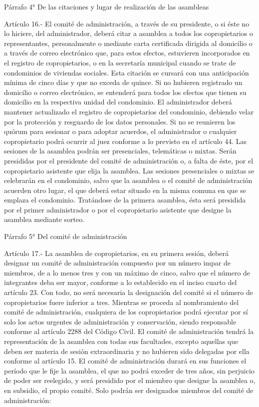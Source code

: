      
    Párrafo 4°
    De las citaciones y lugar de realización de las asambleas

     
    Artículo 16.- El comité de administración, a través de su presidente, o si éste no lo hiciere, del administrador, deberá citar a asamblea a todos los copropietarios o representantes, personalmente o mediante carta certificada dirigida al domicilio o a través de correo electrónico que, para estos efectos, estuvieren incorporados en el registro de copropietarios, o en la secretaría municipal cuando se trate de condominios de viviendas sociales. Esta citación se cursará con una anticipación mínima de cinco días y que no exceda de quince. Si no hubieren registrado un domicilio o correo electrónico, se entenderá para todos los efectos que tienen su domicilio en la respectiva unidad del condominio. El administrador deberá mantener actualizado el registro de copropietarios del condominio, debiendo velar por la protección y resguardo de los datos personales.
    Si no se reunieren los quórum para sesionar o para adoptar acuerdos, el administrador o cualquier copropietario podrá ocurrir al juez conforme a lo previsto en el artículo 44.
    Las sesiones de la asamblea podrán ser presenciales, telemáticas o mixtas. Serán presididas por el presidente del comité de administración o, a falta de éste, por el copropietario asistente que elija la asamblea. Las sesiones presenciales o mixtas se celebrarán en el condominio, salvo que la asamblea o el comité de administración acuerden otro lugar, el que deberá estar situado en la misma comuna en que se emplaza el condominio.
    Tratándose de la primera asamblea, ésta será presidida por el primer administrador o por el copropietario asistente que designe la asamblea mediante sorteo.
     
    Párrafo 5°
    Del comité de administración
   
    Artículo 17.- La asamblea de copropietarios, en su primera sesión, deberá designar un comité de administración compuesto por un número impar de miembros, de a lo menos tres y con un máximo de cinco, salvo que el número de integrantes deba ser mayor, conforme a lo establecido en el inciso cuarto del artículo 23. Con todo, no será necesaria la designación del comité si el número de copropietarios fuere inferior a tres. Mientras se proceda al nombramiento del comité de administración, cualquiera de los copropietarios podrá ejecutar por sí solo los actos urgentes de administración y conservación, siendo responsable conforme al artículo 2288 del Código Civil.
    El comité de administración tendrá la representación de la asamblea con todas sus facultades, excepto aquellas que deben ser materia de sesión extraordinaria y no hubieren sido delegadas por ella conforme al artículo 15.
    El comité de administración durará en sus funciones el período que le fije la asamblea, el que no podrá exceder de tres años, sin perjuicio de poder ser reelegido, y será presidido por el miembro que designe la asamblea o, en subsidio, el propio comité.
    Solo podrán ser designados miembros del comité de administración:
     
